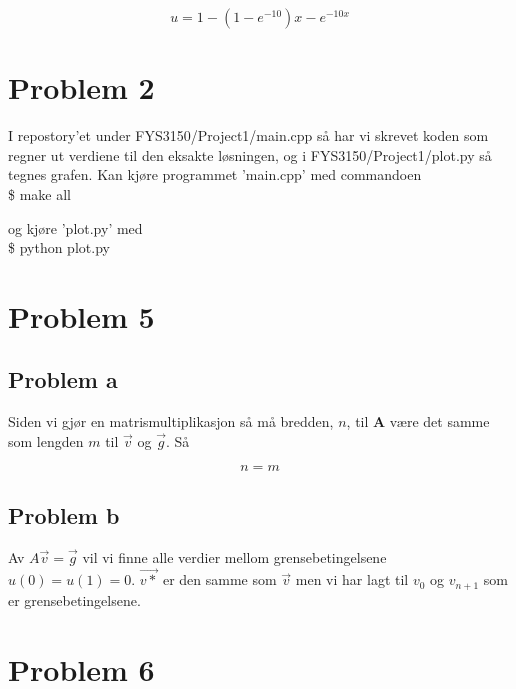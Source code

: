 \documentclass[english,notitlepage]{revtex4-1}  %
\begin{document}
\begin{equation}\label{equ}
u = 1 - (1-e^{-10})x - e^{-10x}
\end{equation}


\section*{Problem 2}

I repostory'et under FYS3150/Project1/main.cpp så har vi skrevet koden som regner ut verdiene til den eksakte løsningen, og i FYS3150/Project1/plot.py så tegnes grafen. Kan kjøre programmet 'main.cpp' med commandoen \\

\$ make all

og kjøre 'plot.py' med \\

\$ python plot.py

\section*{Problem 5}
\subsection*{Problem a}

Siden vi gjør en matrismultiplikasjon så må bredden, $n$, til $\textbf{A}$ være det samme som lengden $m$ til $\overrightarrow{v}$ og $\overrightarrow{g}$. Så

$$n = m$$

\subsection*{Problem b}
Av $A\vec{v}=\vec{g}$ vil vi finne alle verdier mellom grensebetingelsene $u(0)=u(1)=0$. $\vec{v*}$ er den samme som $\vec{v}$ men vi har lagt til $v_0$ og $v_{n+1}$ som er grensebetingelsene.

\section*{Problem 6}
\end{document}
